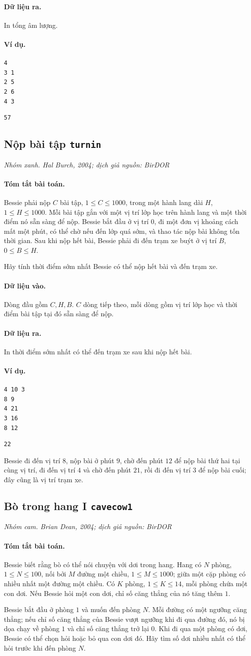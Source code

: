 \documentclass[11pt]{article}
\newcommand{\problem}[4]{%
  \subsection[#1 (#2)]{#1 \hfill {\normalsize\texttt{#2}}}%
  \noindent\textit{#3. #4}\par\smallskip
}
\newcommand{\iosec}[1]{\paragraph{#1}}
\begin{document}
\iosec{Dữ liệu ra.}
In tổng âm lượng.

\iosec{Ví dụ.}
\begin{verbatim}
4
3 1
2 5
2 6
4 3
\end{verbatim}

\begin{verbatim}
57
\end{verbatim}

\problem{Nộp bài tập}{turnin}{Nhóm xanh}{Hal Burch, 2004; dịch giả nguồn: BirDOR}

\iosec{Tóm tắt bài toán.}
Bessie phải nộp \(C\) bài tập, \(1\le C\le 1000\), trong một hành lang dài
\(H\), \(1\le H\le 1000\). Mỗi bài tập gắn với một vị trí lớp học trên hành
lang và một thời điểm nó sẵn sàng để nộp. Bessie bắt đầu ở vị trí \(0\), đi
một đơn vị khoảng cách mất một phút, có thể chờ nếu đến lớp quá sớm, và thao
tác nộp bài không tốn thời gian. Sau khi nộp hết bài, Bessie phải đi đến trạm
xe buýt ở vị trí \(B\), \(0\le B\le H\).

Hãy tính thời điểm sớm nhất Bessie có thể nộp hết bài và đến trạm xe.

\iosec{Dữ liệu vào.}
Dòng đầu gồm \(C,H,B\). \(C\) dòng tiếp theo, mỗi dòng gồm vị trí lớp học và
thời điểm bài tập tại đó sẵn sàng để nộp.

\iosec{Dữ liệu ra.}
In thời điểm sớm nhất có thể đến trạm xe sau khi nộp hết bài.

\iosec{Ví dụ.}
\begin{verbatim}
4 10 3
8 9
4 21
3 16
8 12
\end{verbatim}

\begin{verbatim}
22
\end{verbatim}

Bessie đi đến vị trí \(8\), nộp bài ở phút \(9\), chờ đến phút \(12\) để nộp
bài thứ hai tại cùng vị trí, đi đến vị trí \(4\) và chờ đến phút \(21\), rồi
đi đến vị trí \(3\) để nộp bài cuối; đây cũng là vị trí trạm xe.

\problem{Bò trong hang I}{cavecow1}{Nhóm cam}{Brian Dean, 2004; dịch giả nguồn: BirDOR}

\iosec{Tóm tắt bài toán.}
Bessie biết rằng bò có thể nói chuyện với dơi trong hang. Hang có \(N\) phòng,
\(1\le N\le 100\), nối bởi \(M\) đường một chiều, \(1\le M\le 1000\); giữa một
cặp phòng có nhiều nhất một đường một chiều. Có \(K\) phòng, \(1\le K\le 14\),
mỗi phòng chứa một con dơi. Nếu Bessie hỏi một con dơi, chỉ số căng thẳng của
nó tăng thêm \(1\).

Bessie bắt đầu ở phòng \(1\) và muốn đến phòng \(N\). Mỗi đường có một ngưỡng
căng thẳng; nếu chỉ số căng thẳng của Bessie vượt ngưỡng khi đi qua đường đó,
nó bị dọa chạy về phòng \(1\) và chỉ số căng thẳng trở lại \(0\). Khi đi qua
một phòng có dơi, Bessie có thể chọn hỏi hoặc bỏ qua con dơi đó. Hãy tìm số
dơi nhiều nhất có thể hỏi trước khi đến phòng \(N\).
\end{document}
